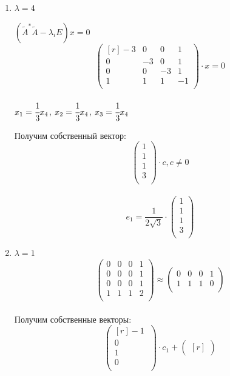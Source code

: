 \documentclass[12pt]{article}
\theoremstyle{definition}
\numberwithin{equation}{section}
\begin{document}
\begin{enumerate}
\item $\lambda = 4$\\
\begin{center}
$(\tilde{A}^*\tilde{A}-\lambda_iE)x=0$\\
\[\begin{pmatrix}[r]
-3 & 0 & 0 & 1\\         
0 & -3 & 0 & 1\\
0 & 0 & -3 & 1\\
1 & 1 & 1 & -1\\
\end{pmatrix}\cdot x = 0\]
\\
$x_1=\cfrac{1}{3}x_4$, 
$x_2=\cfrac{1}{3}x_4$, 
$x_3=\cfrac{1}{3}x_4$
\end{center}
Получим собственный вектор: \[\begin{pmatrix}
1\\         
1\\
1\\
3\\
\end{pmatrix} \cdot c, c\neq 0\]
\\
\[e_1 = \frac{1}{2\sqrt{3}} \cdot \begin{pmatrix}
1\\         
1\\
1\\
3\\
\end{pmatrix}\]
\item $\lambda=1$\\
\[\begin{pmatrix}
0 & 0 & 0 & 1\\         
0 & 0 & 0 & 1\\
0 & 0 & 0 & 1\\
1 & 1 & 1 & 2\\
\end{pmatrix} \approx \begin{pmatrix}
0 & 0 & 0 & 1\\         
1 & 1 & 1 & 0\\
\end{pmatrix}\]
\\
Получим собственные векторы: \[\begin{pmatrix}[r]
-1~\\         
0~\\
1~\\
0~\\
\end{pmatrix} \cdot c_1 + \begin{pmatrix}[r]

\end{pmatrix}\]
\end{enumerate}
\end{document}
